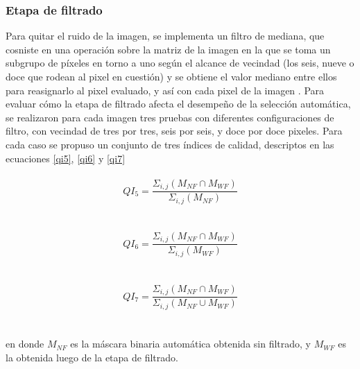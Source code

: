 \subsubsection{Etapa de filtrado}
Para quitar el ruido de la imagen, se implementa un filtro de mediana, que cosniste en una operación sobre la matriz de la imagen en la que se toma un subgrupo de píxeles en torno a uno según el alcance de vecindad (los seis, nueve o doce que rodean al pixel en cuestión) y se obtiene el valor mediano entre ellos para reasignarlo al pixel evaluado, y así con cada pixel de la imagen \cite{lim_two-dimensional_1990}. Para evaluar cómo la etapa de filtrado afecta el desempeño de la selección automática, se realizaron para cada imagen tres pruebas con diferentes configuraciones de filtro, con vecindad de tres por tres, seis por seis, y  doce por doce pixeles. Para cada caso se propuso un conjunto de tres índices de calidad, descriptos en las ecuaciones \ref{qi5}, \ref{qi6} y \ref{qi7}
\\
\\
 \begin{equation}
    QI_5=\frac{\Sigma _{i,j}(M_{NF}\cap M_{WF})}{\Sigma _{i,j}(M_{NF}) }
    \label{qi5}
\end{equation}
\\
\\
 \begin{equation}
    QI_6=\frac{\Sigma_{i,j}(M_{NF}\cap M_{WF})}{\Sigma _{i,j}(M_{WF}) }
    \label{qi6}
\end{equation}
\\
\\
\begin{equation}
    QI_7=\frac{\Sigma _{i,j}(M_{NF}\cap M_{WF})}{\Sigma _{i,j}(M_{NF}\cup M_{WF}) }
    \label{qi7}
\end{equation}
\\
\\
en donde $M_{NF}$ es la máscara binaria automática obtenida sin filtrado, y $M_{WF}$ es la obtenida luego de la etapa de filtrado.



\color{black} 


